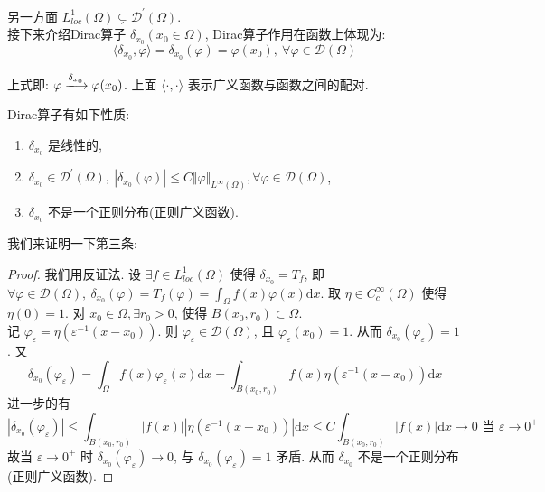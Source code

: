 \documentclass[11pt]{ctexart}[UTF8]
\begin{document}
另一方面 $L_{loc}^{1}(\Omega) \subsetneq \mathscr{D}^{\prime}(\Omega)$.\\
接下来介绍Dirac算子 $\delta_{x_0} (x_{{0}}\in \Omega)$, Dirac算子作用在函数上体现为:
\begin{equation*}
    \langle \delta_{x_0}, \varphi \rangle = \delta_{x_{0}}(\varphi) =\varphi(x_0),\ \forall \varphi \in \mathscr{D}(\Omega)
\end{equation*}
\begin{remark}
    上式即: $\varphi \xlongrightarrow{\delta_{x_{0}}}\varphi(x_0)$. 上面 $\langle \cdot, \cdot \rangle$ 表示广义函数与函数之间的配对.
\end{remark}
Dirac算子有如下性质:
\begin{property}\leavevmode
    \begin{enumerate}
        \item $\delta_{x_0}$ 是线性的,
        \item $\delta_{x_0} \in \mathscr{D}^{\prime}(\Omega),\ \left| \delta_{x_0}(\varphi) \right| \leq C \Vert \varphi \Vert_{L^{\infty}(\Omega)}, \forall \varphi \in \mathscr{D}(\Omega)$,
        \item $\delta_{x_0}$ 不是一个正则分布(正则广义函数).
    \end{enumerate}
\end{property}
我们来证明一下第三条:
\begin{proof}
    我们用反证法. 设 $\exists f \in L_{loc}^{1}(\Omega)$ 使得 $\delta_{x_0} = T_f$, 即 $\forall \varphi \in \mathscr{D}(\Omega),\ \delta_{x_0}(\varphi) = T_f(\varphi) = \int_{\Omega} f(x) \varphi(x) \mathrm{d}x$.
    取 $\eta \in C^{\infty}_c(\Omega)$ 使得 $\eta(0) = 1$. 对 $x_0 \in \Omega, \exists r_0 > 0$, 使得 $B(x_0, r_0) \subset \Omega$.\\
    记 $\varphi_{\varepsilon} = \eta(\varepsilon^{-1}(x - x_0))$. 则 $\varphi_{\varepsilon} \in \mathscr{D}(\Omega)$, 且 $\varphi_{\varepsilon}(x_0) = 1$. 从而 $\delta_{x_0}(\varphi_{\varepsilon}) = 1$. 又
    \begin{equation*}
        \delta_{x_0}(\varphi_{\varepsilon}) = \int_{\Omega} f(x) \varphi_{\varepsilon}(x) \mathrm{d}x = \int_{B(x_0, r_0)} f(x) \eta(\varepsilon^{-1}(x-x_0)) \mathrm{d}x
    \end{equation*}
    进一步的有
    \begin{equation*}
        \left| \delta_{x_0}(\varphi_{\varepsilon}) \right| \leq \int_{B(x_0, r_0)} |f(x)| |\eta(\varepsilon^{-1}(x-x_0))| \mathrm{d}x \leq C \int_{B(x_0, r_0)} |f(x)| \mathrm{d}x \longrightarrow 0 \text{ 当 } \varepsilon \to 0^+
    \end{equation*}
    故当 $\varepsilon \to 0^+$ 时 $\delta_{x_0}(\varphi_{\varepsilon}) \to 0$, 与 $\delta_{x_0}(\varphi_{\varepsilon}) = 1$ 矛盾. 从而 $\delta_{x_0}$ 不是一个正则分布(正则广义函数).
\end{proof}
\end{document}
